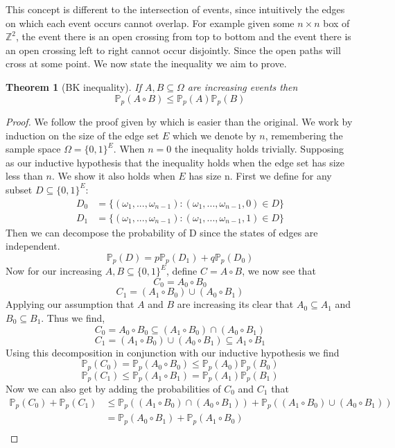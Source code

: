 \documentclass[a4paper,11pt]{article}
\newtheorem{theorem}{Theorem}[section]
\theoremstyle{definition}
\newcommand{\ints}{\mathbb{Z}}
\newcommand{\prob}{\mathbb{P}_p}
\begin{document}
This concept is different to the intersection of events, since intuitively the edges on which each event occurs cannot overlap.
For example given some $n\times n$ box of $\ints^2$, the event there is an open crossing from top to bottom and the event there is an open crossing left to right cannot occur disjointly. Since the open paths will cross at some point.
We now state the inequality we aim to prove.
\begin{theorem}[BK inequality]
	If $A, B \subseteq \Omega$ are increasing events then
	$$\prob(A \circ B) \leq \prob(A)\prob(B)$$
\end{theorem}
\begin{proof}
	We follow the proof given by \cite{bollo2006} which is easier than the original.
	We work by induction on the size of the edge set $E$ which we denote by $n$, remembering the sample space $\Omega = \{0,1\}^E$.
	When $n = 0$ the inequality holds trivially.
	Supposing as our inductive hypothesis that the inequality holds when the edge set has size less than $n$.
	We show it also holds when $E$ has size n.
	First we define for any subset $D \subseteq \{0,1\}^E$:
	\begin{align*}
		D_0 &= \{(\omega_1,...,\omega_{n-1}) : (\omega_1,...,\omega_{n-1}, 0 ) \in D\}\\
		D_1 &= \{(\omega_1,...,\omega_{n-1}) : (\omega_1,...,\omega_{n-1}, 1 ) \in D\}
	\end{align*}
	Then we can decompose the probability of D since the states of edges are independent.
	$$\prob(D) = p\prob(D_1) + q\prob(D_0)$$
	Now for our increasing $A,B \subseteq \{0,1\}^E$, define $C = A \circ B$, we now see that 
	$$C_0 = A_0 \circ B_0$$
	$$C_1 = (A_1 \circ B_0) \cup (A_0 \circ B_1)$$
	Applying our assumption that $A$ and $B$ are increasing its clear that $A_0 \subseteq A_1$ and $B_0 \subseteq B_1$.
	Thus we find,
	$$C_0 = A_0 \circ B_0 \subseteq (A_1 \circ B_0) \cap (A_0 \circ B_1)$$
	$$C_1 = (A_1 \circ B_0) \cup (A_0 \circ B_1) \subseteq A_1 \circ B_1$$
	Using this decomposition in conjunction with our inductive hypothesis we find 
	$$\prob(C_0) = \prob(A_0 \circ B_0) \leq \prob(A_0)\prob(B_0)$$
	$$\prob(C_1) \leq \prob(A_1 \circ B_1) = \prob(A_1)\prob(B_1)$$
	Now we can also get by adding the probabilities of $C_0$ and $C_1$ that 
	\begin{align*}
		\prob(C_0) + \prob(C_1) &\leq \prob((A_1 \circ B_0) \cap (A_0 \circ B_1)) + \prob((A_1 \circ B_0) \cup (A_0 \circ B_1))\\
								&= \prob(A_0 \circ B_1) + \prob(A_1 \circ B_0)\\

\end{align*}
\end{proof}
\end{document}
